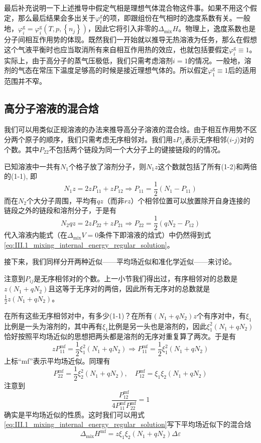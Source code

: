 \documentclass[main.tex]{subfiles}
\begin{document}
最后补充说明一下上述推导中假定气相是理想气体混合物这件事。如果不用这个假定，那么最后结果会多出关于$\varphi_i^\text{g}$的项，即跟组份在气相时的逸度系数有关。一般地，$\varphi_i^\text{g}=\varphi_i^\text{g}\left(T,p,\left\{n_j\right\}\right)$，因此它将引入非零的$\Delta_\text{mix}H$。物理上，逸度系数也是分子间相互作用势的体现。既然我们一开始就以推导无热溶液为任务，那么在假想这个气液平衡时也应当取消所有来自相互作用热的效应，也就包括要假定$\varphi_i^\text{g}\equiv 1$。实际上，由于高分子的蒸气压极低，我们只需考虑溶剂$i=1$的情况。一般地，溶剂的气态在常压下温度足够高的时候是接近理想气体的。所以假定$\varphi_1^\text{g}\equiv 1$后的适用范围并不窄。

\subsection{高分子溶液的混合焓}
我们可以用类似正规溶液的办法来推导高分子溶液的混合焓。由于相互作用势不区分两个原子的顺序，我们只需考虑无序相邻对。我们用$zP_{ij}$表示无序相邻($i$-$j$)对的个数。其中$P_{22}$不包括两个链段为同一个大分子上的键接链段的的情况。

已知溶液中一共有$N_1$个格子放了溶剂分子，则$N_1z$这个数就包括了所有(1-2)和两倍的(1-1), 即
\[N_1z=2zP_{11}+zP_{12}\Rightarrow P_{11}=\frac{1}{2}\left(N_1-P_{11}\right)\]
而在$N_2$个大分子周围，平均有$qz$（而非$rz$）个相邻位置可以放置除开自身连接的链段之外的链段和溶剂分子，于是有
\[N_2qz=2zP_{22}+zP_{21}\Rightarrow P_{22}=\frac{1}{2}\left(qN_2-P_{12}\right)\]
代入溶液内能式（在$\Delta_\text{mix}V=0$条件下即溶液的焓式）中仍然得到式\eqref{eq:III.1_mixing_internal_energy_regular_solution}。

接下来，我们同样分开两种近似——平均场近似和准化学近似——来讨论。

注意到$P_{ij}$是无序相邻对的个数。上一小节我们得出过，有序相邻对的总数是$z\left(N_1+qN_2\right)$且这等于无序对的两倍，因此所有无序对的总数就是$\frac{1}{2}z\left(N_1+qN_2\right)$。

在所有这些无序相邻对中，有多少(1-1)？在所有$\left(N_1+qN_2\right)z$个有序对中，有$\xi_1$比例是一头为溶剂的，其中再有$\xi_1$比例是另一头也是溶剂的，因此$\xi_1^2\left(N_1+qN_2\right)$恰好按照平均场近似的思想把两头都是溶剂的无序对重复算了两次。于是有
\[zP_{11}^\text{mf}=\frac{1}{2}\xi_1^2\left(N_1+qN_2\right)\Rightarrow P_{11}^\text{mf}=\frac{1}{2}\xi_1^2\left(N_1+qN_2\right)\]
上标“mf”表示平均场近似。同理有
\[P_{22}^\text{mf}=\frac{1}{2}\xi_2^2\left(N_1+qN_2\right),\quad P_{12}^\text{mf}=\xi_1\xi_2\left(N_1+qN_2\right)\]
注意到
\[\frac{P_{12}^\text{mf}}{4P_{11}^\text{mf}P_{22}^\text{mf}}=1\]
确实是平均场近似的性质。这时我们可以用式\eqref{eq:III.1_mixing_internal_energy_regular_solution}写下平均场近似下的混合焓
\begin{equation}\label{eq:III.3_polymer_solution_mixing_enthalpy_mf}\Delta_\text{mix}H^\text{mf}=z\xi_1\xi_2\left(N_1+qN_2\right)\Delta\varepsilon\end{equation}
\end{document}

